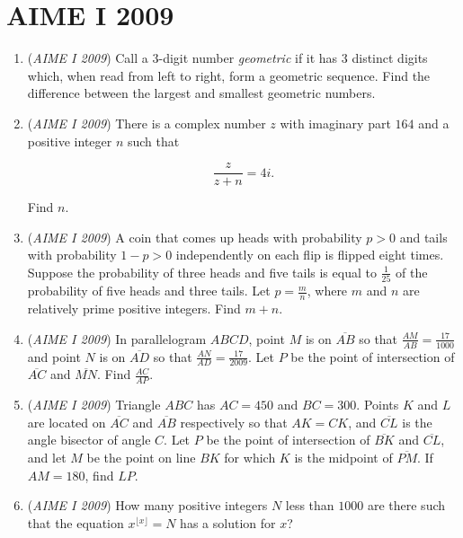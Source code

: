 \section{AIME I 2009}
        \begin{enumerate}
        	\item (\textit{AIME I 2009}) Call a $3$-digit number \textit{geometric} if it has $3$ distinct digits which, when read from left to right, form a geometric sequence.  Find the difference between the largest and smallest geometric numbers.


 

	\item (\textit{AIME I 2009}) There is a complex number $z$ with imaginary part $164$ and a positive integer $n$ such that


 
 \[\frac {z}{z + n} = 4i.\]


 Find $n$.


 

	\item (\textit{AIME I 2009}) A coin that comes up heads with probability $p > 0$ and tails with probability $1 - p > 0$ independently on each flip is flipped eight times. Suppose the probability of three heads and five tails is equal to $\frac {1}{25}$ of the probability of five heads and three tails. Let $p = \frac {m}{n}$, where $m$ and $n$ are relatively prime positive integers. Find $m + n$.


 

	\item (\textit{AIME I 2009}) In parallelogram $ABCD$, point $M$ is on $\overline{AB}$ so that $\frac {AM}{AB} = \frac {17}{1000}$ and point $N$ is on $\overline{AD}$ so that $\frac {AN}{AD} = \frac {17}{2009}$. Let $P$ be the point of intersection of $\overline{AC}$ and $\overline{MN}$. Find $\frac {AC}{AP}$.


 

	\item (\textit{AIME I 2009}) Triangle $ABC$ has $AC = 450$ and $BC = 300$. Points $K$ and $L$ are located on $\overline{AC}$ and $\overline{AB}$ respectively so that $AK = CK$, and $\overline{CL}$ is the angle bisector of angle $C$. Let $P$ be the point of intersection of $\overline{BK}$ and $\overline{CL}$, and let $M$ be the point on line $BK$ for which $K$ is the midpoint of $\overline{PM}$. If $AM = 180$, find $LP$.


 

	\item (\textit{AIME I 2009}) How many positive integers $N$ less than $1000$ are there such that the equation $x^{\lfloor x\rfloor} = N$ has a solution for $x$?



\end{enumerate}
